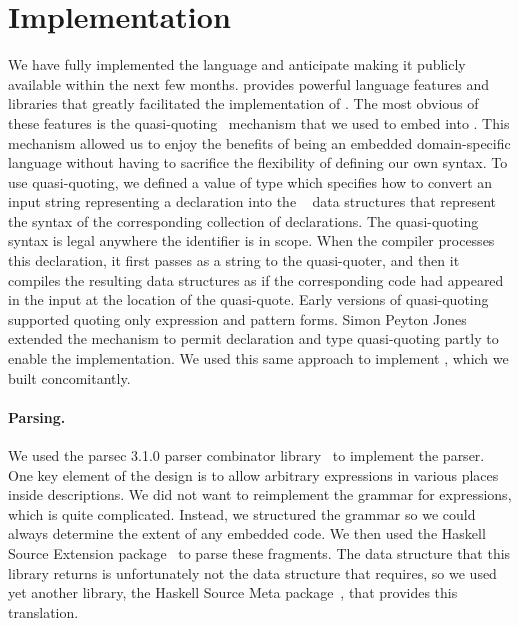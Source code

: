 \section{Implementation}
\label{sec:implementation}
We have fully implemented the \forest{} language and anticipate making
it publicly available within the next few months.
\haskell{} provides powerful language features and libraries that
greatly facilitated the implementation of \forest{}.  The most obvious
of these features is the quasi-quoting~\cite{Mainland:quasi} mechanism
that we used to embed \forest{} into \haskell{}.  This mechanism
allowed us to enjoy the benefits of being an embedded domain-specific
language without having to sacrifice the flexibility of
defining our own syntax. To use quasi-quoting, we defined a \haskell{}
value  of type  which specifies how to
convert an input string representing a \forest{} declaration into the
\template{}~\cite{Sheard+:templatehaskell} 
data structures that represent the syntax of the
corresponding collection of \haskell{} declarations.
The quasi-quoting syntax 
is legal anywhere the identifier  is in scope.
When the \haskell{} compiler processes this declaration, it first
passes  as a string to the  quasi-quoter, and
then it compiles the resulting \template{} data structures as if the
corresponding \haskell{} code had appeared in the input at the
location of the quasi-quote.  Early versions of quasi-quoting
supported quoting only expression and pattern forms.  Simon Peyton
Jones extended the mechanism to permit declaration and type
quasi-quoting partly to enable the \forest{} implementation.  We used
this same approach to implement \padshaskell{}, which we built
concomitantly. 

\paragraph{Parsing.}  
We used the parsec 3.1.0 parser
combinator library~\cite{LeijenMeijer:parsec} to implement the \forest{} parser.  One key element
of the \forest{} design is to allow arbitrary \haskell{} expressions
in various places inside \forest{} descriptions.  We did not want to
reimplement the grammar for \haskell{} expressions, which is quite
complicated.  Instead, we structured the \forest{} grammar so we could
always determine the extent of any embedded \haskell{} code.  We then
used the Haskell Source Extension package~\cite{haskell-src-exts} to parse
these fragments.  The data structure that this library returns is
unfortunately not the data structure that \template{} requires, so we
used yet another library, the Haskell Source Meta
package~\cite{haskell-src-meta}, that provides this translation. 



